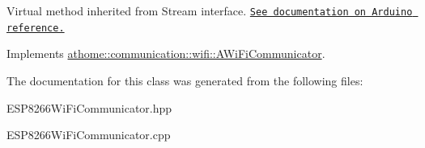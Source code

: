 Virtual method inherited from Stream interface. \href{https://www.arduino.cc/en/Serial/Write}{\tt See documentation on Arduino reference.} 

Implements \mbox{\hyperlink{classathome_1_1communication_1_1wifi_1_1_a_wi_fi_communicator_a7544a06e5b6d65108cb2c0c5702c5f29}{athome\+::communication\+::wifi\+::\+A\+Wi\+Fi\+Communicator}}.



The documentation for this class was generated from the following files\+:\begin{DoxyCompactItemize}
\item 
E\+S\+P8266\+Wi\+Fi\+Communicator.\+hpp\item 
E\+S\+P8266\+Wi\+Fi\+Communicator.\+cpp\end{DoxyCompactItemize}

